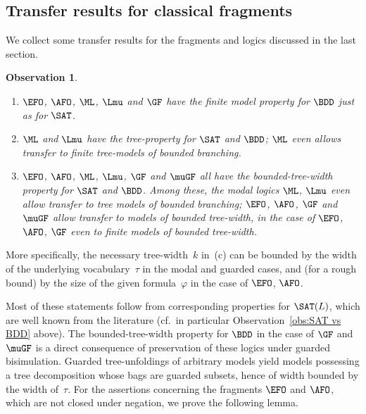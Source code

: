 \documentclass{LMCS}
\newtheorem{observation}[thm]{Observation}
\begin{document}
\subsection{Transfer results for classical fragments}
\label{sect:classical transfer}

We collect some transfer results for the fragments
and logics discussed in the last section.

\begin{observation}\label{obs:classical transfer results}\hfill
\begin{enumerate}[label=\({\alph*}]
\item $\EFO$, $\AFO$, $\ML$, $\Lmu$ and\/ $\GF$
  have the \emph{finite model property} for $\BDD$ just as for $\SAT$.
\item[\normalfont(b)]
  $\ML$ and\/ $\Lmu$ have the \emph{tree-property} for
  $\SAT$ and\/ $\BDD$\?;
  $\ML$ even allows transfer to \emph{finite} tree-models
  of bounded branching.
\item $\EFO$, $\AFO$, $\ML$, $\Lmu$, $\GF$ and $\muGF$ all have
  the \emph{bounded-tree-width property} for $\SAT$ and\/ $\BDD$.
  Among these, the modal logics $\ML$, $\Lmu$ even allow transfer to
  tree models of bounded branching\?;
  $\EFO$, $\AFO$, $\GF$ and $\muGF$ allow transfer to models of
  bounded tree-width, in the case of $\EFO$, $\AFO$, $\GF$ even
  to \emph{finite} models of bounded tree-width.
\end{enumerate}
\end{observation}


\noindent More specifically, the necessary tree-width~$k$ in~(c) can be
bounded by the width of the underlying vocabulary~$\tau$
in the modal and guarded cases,
and (for a rough bound) by the size of the given formula~$\varphi$
in the case of $\EFO$, $\AFO$.

Most of these statements follow
from corresponding properties for $\SAT(L)$,
which are well known from the literature
(cf.~in particular Observation~\ref{obs:SAT vs BDD} above).
The bounded-tree-width property for $\BDD$ in the
case of $\GF$ and $\muGF$ is a direct consequence of
preservation of these logics under guarded bisimulation. Guarded
tree-unfoldings \cite{Graedel99,GHO} of arbitrary models yield
models possessing a tree decomposition whose bags are guarded subsets,
hence of width bounded by the width of~$\tau$.
For the assertions concerning the fragments $\EFO$ and $\AFO$, which
are not closed under negation, we prove the following lemma.
\end{document}
